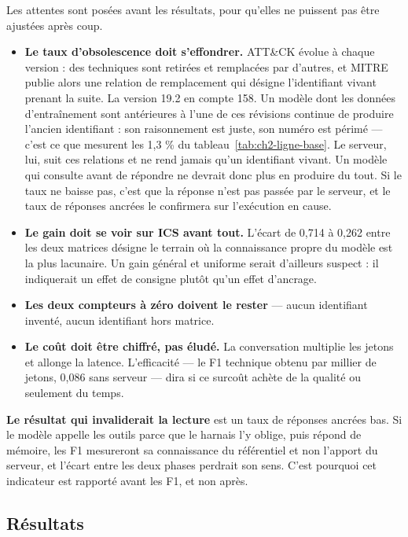Les attentes sont posées avant les résultats, pour qu'elles ne puissent pas être ajustées après coup.

\begin{itemize}
\tightlist
\item
  \textbf{Le taux d'obsolescence doit s'effondrer.} ATT\&CK évolue à chaque version : des techniques sont retirées et remplacées par d'autres, et MITRE publie alors une relation de remplacement qui désigne l'identifiant vivant prenant la suite. La version 19.2 en compte 158. Un modèle dont les données d'entraînement sont antérieures à l'une de ces révisions continue de produire l'ancien identifiant : son raisonnement est juste, son numéro est périmé --- c'est ce que mesurent les 1,3 \% du tableau~\ref{tab:ch2-ligne-base}. Le serveur, lui, suit ces relations et ne rend jamais qu'un identifiant vivant. Un modèle qui consulte avant de répondre ne devrait donc plus en produire du tout. Si le taux ne baisse pas, c'est que la réponse n'est pas passée par le serveur, et le taux de réponses ancrées le confirmera sur l'exécution en cause.
\item
  \textbf{Le gain doit se voir sur ICS avant tout.} L'écart de 0,714 à 0,262 entre les deux matrices désigne le terrain où la connaissance propre du modèle est la plus lacunaire. Un gain général et uniforme serait d'ailleurs suspect : il indiquerait un effet de consigne plutôt qu'un effet d'ancrage.
\item
  \textbf{Les deux compteurs à zéro doivent le rester} --- aucun identifiant inventé, aucun identifiant hors matrice.
\item
  \textbf{Le coût doit être chiffré, pas éludé.} La conversation multiplie les jetons et allonge la latence. L'efficacité --- le F1 technique obtenu par millier de jetons, 0,086 sans serveur --- dira si ce surcoût achète de la qualité ou seulement du temps.
\end{itemize}

\textbf{Le résultat qui invaliderait la lecture} est un taux de réponses ancrées bas. Si le modèle appelle les outils parce que le harnais l'y oblige, puis répond de mémoire, les F1 mesureront sa connaissance du référentiel et non l'apport du serveur, et l'écart entre les deux phases perdrait son sens. C'est pourquoi cet indicateur est rapporté avant les F1, et non après.

\subsection{Résultats}\label{sec:ch2-3-5}

